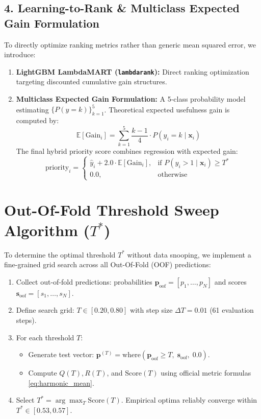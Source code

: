 \subsection{4. Learning-to-Rank \& Multiclass Expected Gain Formulation}
To directly optimize ranking metrics rather than generic mean squared error, we introduce:
\begin{enumerate}
  \item \textbf{LightGBM LambdaMART (\texttt{lambdarank}):} Direct ranking optimization \cite{burges2010ranknet} targeting discounted cumulative gain structures.
  \item \textbf{Multiclass Expected Gain Formulation:} A 5-class probability model estimating $\{P(y=k)\}_{k=1}^5$. Theoretical expected usefulness gain is computed by:
  \begin{equation}
    \mathbb{E}[\text{Gain}_i] = \sum_{k=1}^5 \frac{k - 1}{4} \cdot P(y_i = k \mid \bm{x}_i)
    \label{eq:expected_gain}
  \end{equation}
  The final hybrid priority score combines regression with expected gain:
  \begin{equation}
    \text{priority}_i = 
    \begin{cases}
      \hat{y}_i + 2.0 \cdot \mathbb{E}[\text{Gain}_i], & \text{if } P(y_i > 1 \mid \bm{x}_i) \ge T^* \\
      0.0, & \text{otherwise}
    \end{cases}
    \label{eq:priority_formula}
  \end{equation}
\end{enumerate}

\section{Out-Of-Fold Threshold Sweep Algorithm ($T^*$)}
To determine the optimal threshold $T^*$ without data snooping, we implement a fine-grained grid search across all Out-Of-Fold (OOF) predictions:

\begin{prismbox}[title=\textbf{Out-Of-Fold Threshold Calibration Algorithm}]
\begin{enumerate}
  \item Collect out-of-fold predictions: probabilities $\bm{p}_{\text{oof}} = [p_1, \dots, p_N]$ and scores $\bm{s}_{\text{oof}} = [s_1, \dots, s_N]$.
  \item Define search grid: $T \in [0.20, 0.80]$ with step size $\Delta T = 0.01$ (61 evaluation steps).
  \item For each threshold $T$:
    \begin{itemize}
      \item Generate test vector: $\bm{p}^{(T)} = \text{where}(\bm{p}_{\text{oof}} \ge T, \; \bm{s}_{\text{oof}}, \; 0.0)$.
      \item Compute $Q(T), R(T)$, and $\text{Score}(T)$ using official metric formulas \eqref{eq:harmonic_mean}.
    \end{itemize}
  \item Select $T^* = \arg\max_T \text{Score}(T)$. Empirical optima reliably converge within $T^* \in [0.53, 0.57]$.
\end{enumerate}
\end{prismbox}

